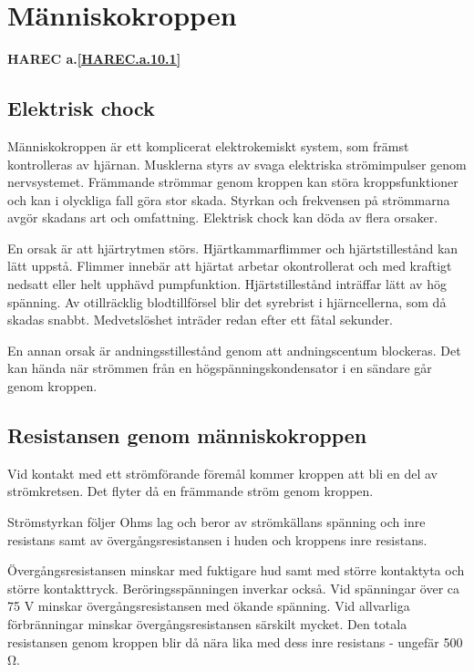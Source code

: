 \section{Människokroppen}
\textbf{
HAREC a.\ref{HAREC.a.10.1}\label{myHAREC.a.10.1}
}

\subsection{Elektrisk chock}

Människokroppen är ett komplicerat elektrokemiskt system, som främst
kontrolleras av hjärnan. Musklerna styrs av svaga elektriska
strömimpulser genom nervsystemet. Främmande strömmar genom kroppen kan
störa kroppsfunktioner och kan i olyckliga fall göra stor
skada. Styrkan och frekvensen på strömmarna avgör skadans art och
omfattning.  Elektrisk chock kan döda av flera orsaker.

En orsak är att hjärtrytmen störs. Hjärtkammarflimmer och
hjärtstillestånd kan lätt uppstå. Flimmer innebär att hjärtat arbetar
okontrollerat och med kraftigt nedsatt eller helt upphävd
pumpfunktion. Hjärtstillestånd inträffar lätt av hög spänning. Av
otillräcklig blodtillförsel blir det syrebrist i hjärncellerna, som då
skadas snabbt. Medvetslöshet inträder redan efter ett fåtal sekunder.

En annan orsak är andningsstillestånd genom att andningscentum
blockeras. Det kan hända när strömmen från en högspänningskondensator
i en sändare går genom kroppen.

\subsection{Resistansen genom människokroppen}

Vid kontakt med ett strömförande föremål kommer kroppen att bli en del
av strömkretsen. Det flyter då en främmande ström genom kroppen.

Strömstyrkan följer Ohms lag och beror av strömkällans spänning och
inre resistans samt av övergångsresistansen i huden och kroppens inre
resistans.

Övergångsresistansen minskar med fuktigare hud samt med större
kontaktyta och större kontakttryck. Beröringsspänningen inverkar
också. Vid spänningar över ca 75 V minskar övergångsresistansen med
ökande spänning. Vid allvarliga förbränningar minskar
övergångsresistansen särskilt mycket.  Den totala resistansen genom
kroppen blir då nära lika med dess inre resistans - ungefär 500 Ω.

